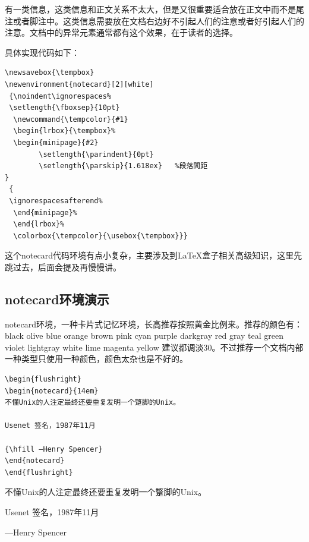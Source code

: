 \documentclass[11pt,oneside]{book}
\begin{document}
有一类信息，这类信息和正文关系不太大，但是又很重要适合放在正文中而不是尾注或者脚注中。这类信息需要放在文档右边好不引起人们的注意或者好引起人们的注意。文档中的异常元素通常都有这个效果，在于读者的选择。

具体实现代码如下：
\begin{Verbatim}
\newsavebox{\tempbox}
\newenvironment{notecard}[2][white]
 {\noindent\ignorespaces%
 \setlength{\fboxsep}{10pt}
  \newcommand{\tempcolor}{#1}
  \begin{lrbox}{\tempbox}%
  \begin{minipage}{#2}
        \setlength{\parindent}{0pt}
        \setlength{\parskip}{1.618ex}   %段落間距
}
 {
 \ignorespacesafterend%
  \end{minipage}%
  \end{lrbox}%
  \colorbox{\tempcolor}{\usebox{\tempbox}}}
\end{Verbatim}

这个notecard代码环境有点小复杂，主要涉及到\LaTeX 盒子相关高级知识，这里先跳过去，后面会提及再慢慢讲。


\subsection{notecard环境演示}
notecard环境，一种卡片式记忆环境，长高推荐按照黄金比例来。推荐的颜色有：black olive blue orange brown pink cyan purple darkgray red gray teal green violet lightgray white lime magenta yellow 建议都调淡30。不过推荐一个文档内部一种类型只使用一种颜色，颜色太杂也是不好的。

\begin{Verbatim}
\begin{flushright}
\begin{notecard}{14em}
不懂Unix的人注定最终还要重复发明一个蹩脚的Unix。

Usenet 签名，1987年11月

{\hfill —Henry Spencer}
\end{notecard}
\end{flushright}
\end{Verbatim}

\begin{flushright}
\begin{notecard}{14em}
不懂Unix的人注定最终还要重复发明一个蹩脚的Unix。

Usenet 签名，1987年11月

{\hfill —Henry Spencer}
\end{notecard}
\end{flushright}
\end{document}
